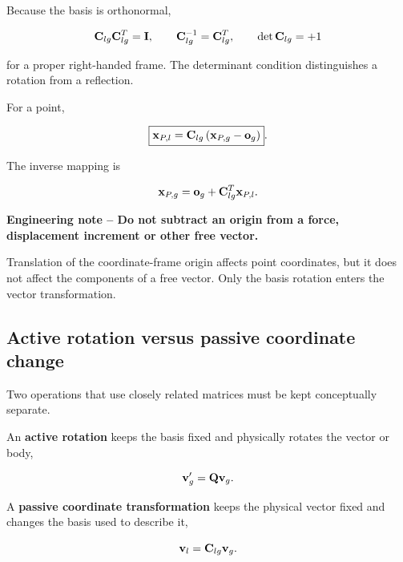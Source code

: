 Because the basis is orthonormal,

\begin{equation}\label{eq:coord-orthogonal}
    \mathbf{C}_{lg}\mathbf{C}_{lg}^{T}=\mathbf{I},
    \qquad
    \mathbf{C}_{lg}^{-1}=\mathbf{C}_{lg}^{T},
    \qquad
    \det\mathbf{C}_{lg}=+1
\end{equation}

for a proper right-handed frame. The determinant condition distinguishes a
rotation from a reflection.

For a point,

\begin{equation}\label{eq:coord-point-transform}
    \boxed{
    \mathbf{x}_{P,l}=\mathbf{C}_{lg}\left(\mathbf{x}_{P,g}-\mathbf{o}_g\right)
    }.
\end{equation}

The inverse mapping is

\begin{equation}
    \mathbf{x}_{P,g}=\mathbf{o}_g+\mathbf{C}_{lg}^{T}\mathbf{x}_{P,l}.
\end{equation}

\begin{bbox}
\textbf{Engineering note -- Do not subtract an origin from a force, displacement
increment or other free vector.}

Translation of the coordinate-frame origin affects point coordinates, but it
does not affect the components of a free vector. Only the basis rotation enters
the vector transformation.
\end{bbox}

\subsection{Active rotation versus passive coordinate change}

Two operations that use closely related matrices must be kept conceptually
separate.

An \textbf{active rotation} keeps the basis fixed and physically rotates the
vector or body,

\begin{equation}\label{eq:coord-active}
    \mathbf{v}'_g=\mathbf{Q}\mathbf{v}_g.
\end{equation}

A \textbf{passive coordinate transformation} keeps the physical vector fixed and
changes the basis used to describe it,

\begin{equation}
    \mathbf{v}_l=\mathbf{C}_{lg}\mathbf{v}_g.
\end{equation}

